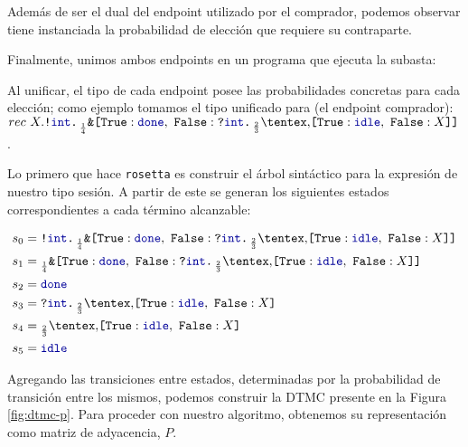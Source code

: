 Además de ser el dual del endpoint utilizado por el comprador, podemos observar
tiene instanciada la probabilidad de elección que requiere su contraparte.

Finalmente, unimos ambos endpoints en un programa que ejecuta la subasta:

\TestAuction

Al unificar, el tipo de cada endpoint posee las probabilidades concretas para
cada elección; como ejemplo tomamos el tipo unificado para  (el
endpoint comprador): $rec\
X.\Out\tint\BinaryPBranch[\frac{1}{4}]{\Done}{\In\tint\BinaryPChoice[\frac{2}{3}]{\Idle}{X}}$.

Lo primero que hace \texttt{rosetta} es construir el árbol sintáctico para la expresión
de nuestro tipo sesión. A partir de este se generan los siguientes estados
correspondientes a cada término alcanzable:

\begin{align*}
	s_0 &= \Out\tint\BinaryPBranch[\frac{1}{4}]{\Done}{\In\tint\BinaryPChoice[\frac{2}{3}]{\Idle}{X}} \\
	s_1 &= \BinaryPBranch[\frac{1}{4}]{\Done}{\In\tint\BinaryPChoice[\frac{2}{3}]{\Idle}{X}} \\
	s_2 &= \Done \\
	s_3 &= \In\tint\BinaryPChoice[\frac{2}{3}]{\Idle}{X} \\
	s_4 &= \BinaryPChoice[\frac{2}{3}]{\Idle}{X} \\
	s_5 &= \Idle \\
\end{align*}

Agregando las transiciones entre estados, determinadas por la probabilidad de
transición entre los mismos, podemos construir la DTMC presente en la Figura
\ref{fig:dtmc-p}. Para proceder con nuestro algoritmo, obtenemos su
representación como matriz de adyacencia, $P$.

